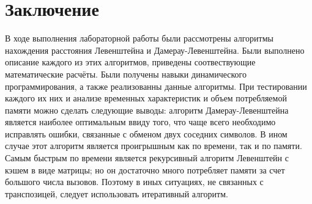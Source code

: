\chapter*{Заключение}
В ходе выполнения лабораторной работы были рассмотрены алгоритмы нахождения расстояния Левенштейна и Дамерау-Левенштейна. Были выполнено описание каждого из этих алгоритмов, приведены соотвествующие математические расчёты. Были получены навыки динамического программирования, а также реализованны данные алгоритмы. При тестировании каждого их них и анализе временных характеристик и объем потребляемой памяти можно сделать следующие выводы: алгоритм Дамерау-Левенштейна является наиболее оптимальным ввиду того, что чаще всего необходимо исправлять ошибки, связанные с обменом двух соседних символов. В ином случае этот алгоритм является проигрышным как по времени, так и по памяти. Самым быстрым по времени является рекурсивный алгоритм Левенштейн с кэшем в виде матрицы; но он достаточно много потребляет памяти за счет большого числа вызовов. Поэтому в иных ситуациях, не связанных с транспозицей, следует использовать итеративный алгоритм.
  